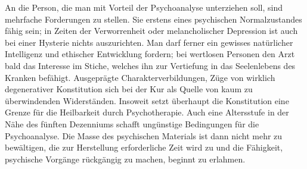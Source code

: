 \documentclass[twoside=true,titlepage=false,open=any, parskip=never, fontsize=10pt, headings=small, chapterprefix=false, appendixprefix=false]{scrbook}
\begin{document}
            
        \pstart
        An die Person, die man mit Vorteil der Psychoanalyse unterziehen
               soll, sind mehrfache Forderungen zu stellen. Sie  erstens eines psychischen Normalzustandes fähig sein; in Zeiten der Verworrenheit oder
               melancholischer Depression ist auch bei einer Hysterie nichts auszurichten. Man
               darf ferner ein gewisses
                natürlicher Intelligenz und ethischer Entwicklung fordern; bei wertlosen
               Personen  den Arzt bald das Interesse im Stiche, welches ihn zur Vertiefung in das
               Seelenlebens des Kranken befähigt. Ausgeprägte Charakterverbildungen, Züge
               von wirklich degenerativer Konstitution  sich bei der Kur als Quelle von kaum zu überwindenden Widerständen.
               Insoweit setzt überhaupt die Konstitution eine Grenze für die Heilbarkeit
               durch Psychotherapie. Auch eine Altersstufe in der Nähe des fünften
               Dezenniums schafft ungünstige Bedingungen für die Psychoanalyse. Die
               Masse des psychischen Materials ist dann nicht mehr zu bewältigen, die zur
               Herstellung erforderliche Zeit wird zu  und die Fähigkeit, psychische Vorgänge rückgängig zu machen, beginnt zu
               erlahmen.
        \pend
    

            
            
\end{document}
